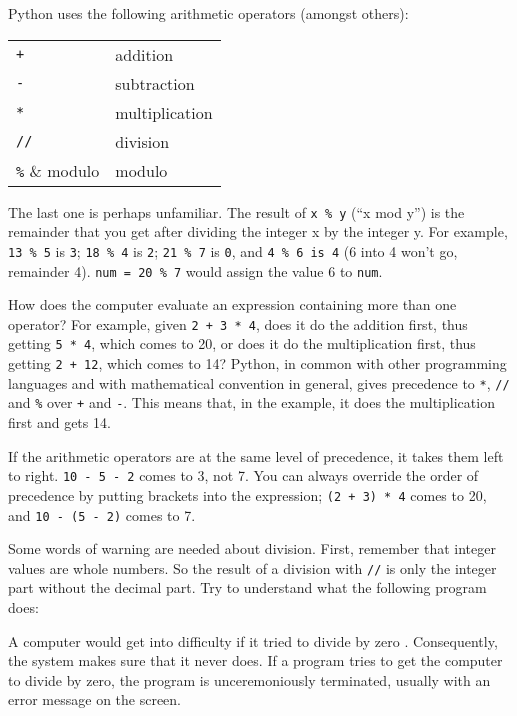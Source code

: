 Python uses the following arithmetic operators (amongst others):
\bigskip

\begin{tabular}{ll}
\verb!+! & addition\\
\verb!-! & subtraction\\
\verb!*! & multiplication\\
\verb!//! & division\\
\verb!%! & modulo\\
\end{tabular}
\bigskip

The last one is perhaps unfamiliar.  The result of \verb!x % y! (``x mod y'')
is the remainder that you get after dividing the integer x by the integer y.
For example, \verb!13 % 5! is \verb!3!; \verb!18 % 4! is \verb!2!; 
\verb!21 % 7! is \verb!0!, and \verb!4 % 6 is 4! (6 into 4 won't go, 
remainder 4).  \verb!num = 20 % 7! would assign the value 6
to \verb!num!.

How does the computer evaluate an expression containing more than one
operator? For example, given \verb!2 + 3 * 4!, does it do the
addition first, thus getting \verb!5 * 4!, which comes to 20, or does
it do the multiplication first, thus getting \verb!2 + 12!, which
comes to 14?  Python, in common with other programming languages and
with mathematical convention in general, gives precedence to \verb!*!, \verb!//! and
\verb!%! over \verb!+! and \verb!-!.  This means that, in the example, it does the
multiplication first and gets 14.

If the arithmetic operators are at the same level of precedence, it
takes them left to right.  \verb!10 - 5 - 2! comes to 3, not 7.  You
can always override the order of precedence by putting brackets into
the expression; \verb!(2 + 3) * 4! comes to 20, and \verb!10 - (5 - 2)! comes
to 7.

Some words of warning are needed about division. First, remember that
integer values are whole numbers.
So the result of a division with \verb-//- is
only the integer part without the decimal part. Try to
understand what the following program does:
\pagebreak


A computer would get into difficulty if it tried to divide by
zero .
Consequently, the system makes sure that it never does.
If a program tries to get the computer to divide by zero, the program
is unceremoniously terminated, usually with an error message on the
screen.

